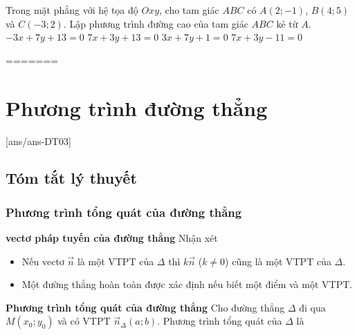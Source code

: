 \begin{ex}%
	Trong mặt phẳng với hệ tọa độ $Oxy$, cho tam giác $ABC$ có
	$A(2;-1)$, $B(4;5)$ và $C(-3;2)$. Lập phương trình đường cao của tam giác $ABC$ kẻ từ $A$.
	\choice
	{$-3x +7y +13 =0$}
	{$7x +3y +13=0$}
	{$3x +7y+1 =0$}
	{\True $7x +3y -11 =0$}
\end{ex}



=======
\setcounter{section}{2}
\setcounter{dang}{0}
\section{Phương trình đường thẳng}
[ans/ans-DT03]
\subsection{Tóm tắt lý thuyết}

\subsubsection{Phương trình tổng quát của đường thẳng}

\textbf{vectơ pháp tuyến của đường thẳng}
	Nhận xét
	\begin{itemize}
		\item Nếu vectơ $\overrightarrow{n}$  là một VTPT của $\Delta$ thì $k \overrightarrow{n}$ ($k \ne 0 $) cũng là một VTPT của $\Delta$. 
		\item Một đường thẳng hoàn toàn được xác định nếu biết một điểm và một VTPT.
	\end{itemize}

\textbf{Phương trình tổng quát của đường thẳng}
	Cho đường thẳng $\Delta$ đi qua $M(x_0;y_0)$ và có VTPT $\overrightarrow{n}_{\Delta} (a;b)$. Phương trình tổng quát của $\Delta$ là 

